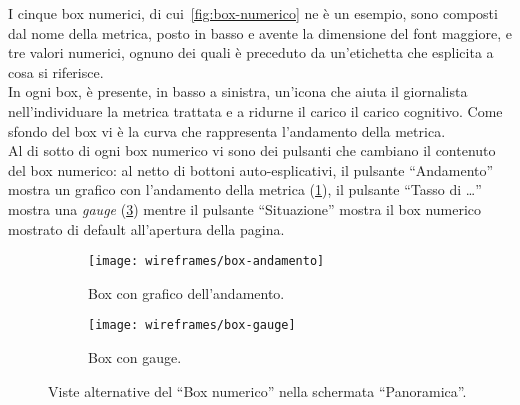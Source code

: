 \documentclass[../../../main.tex]{subfiles}
\begin{document}
I cinque box numerici, di cui~\ref{fig:box-numerico} ne è un esempio, sono composti dal nome della metrica, posto in basso e avente la dimensione del font maggiore, e tre valori numerici, ognuno dei quali è preceduto da un'etichetta che esplicita a cosa si riferisce.\\
In ogni box, è presente, in basso a sinistra, un'icona che aiuta il giornalista nell'individuare la metrica trattata e a ridurne il carico il carico cognitivo. Come sfondo del box vi è la curva che rappresenta l'andamento della metrica.\\
Al di sotto di ogni box numerico vi sono dei pulsanti che cambiano il contenuto del box numerico: al netto di bottoni auto-esplicativi, il pulsante ``Andamento'' mostra un grafico con l'andamento della metrica (\ref{fig:box-andamento}), il pulsante ``Tasso di \dots'' mostra una \textit{gauge} (\ref{fig:box-gauge}) mentre il pulsante ``Situazione'' mostra il box numerico mostrato di default all'apertura della pagina.

\begin{figure}[H]
    \begin{subfigure}[b]{0.5\textwidth}
        \centering
        \texttt{[image: wireframes/box-andamento]}
        \caption{Box con grafico dell'andamento.}
        \label{fig:box-andamento}
    \end{subfigure}
\hfill
    \begin{subfigure}[b]{0.51\textwidth}
        \centering
        \texttt{[image: wireframes/box-gauge]}
        \caption{Box con gauge.}
        \label{fig:box-gauge}
    \end{subfigure}
    \caption{Viste alternative del ``Box numerico'' nella schermata ``Panoramica''.}
\end{figure}
\end{document}

